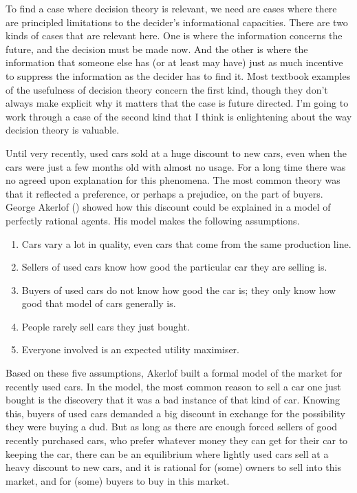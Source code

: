 \documentclass[
  10pt,
  letterpaper,
  DIV=11,
  numbers=noendperiod,
  twoside]{scrartcl}
\providecommand{\tightlist}{%
  \setlength{\itemsep}{0pt}\setlength{\parskip}{0pt}}\usepackage{longtable,booktabs,array}
\begin{document}
To find a case where decision theory is relevant, we need are cases
where there are principled limitations to the decider's informational
capacities. There are two kinds of cases that are relevant here. One is
where the information concerns the future, and the decision must be made
now. And the other is where the information that someone else has (or at
least may have) just as much incentive to suppress the information as
the decider has to find it. Most textbook examples of the usefulness of
decision theory concern the first kind, though they don't always make
explicit why it matters that the case is future directed. I'm going to
work through a case of the second kind that I think is enlightening
about the way decision theory is valuable.

Until very recently, used cars sold at a huge discount to new cars, even
when the cars were just a few months old with almost no usage. For a
long time there was no agreed upon explanation for this phenomena. The
most common theory was that it reflected a preference, or perhaps a
prejudice, on the part of buyers. George Akerlof
() showed how this discount could be
explained in a model of perfectly rational agents. His model makes the
following assumptions.

\begin{enumerate}
\def\labelenumi{\arabic{enumi}.}
\tightlist
\item
  Cars vary a lot in quality, even cars that come from the same
  production line.
\item
  Sellers of used cars know how good the particular car they are selling
  is.
\item
  Buyers of used cars do not know how good the car is; they only know
  how good that model of cars generally is.
\item
  People rarely sell cars they just bought.
\item
  Everyone involved is an expected utility maximiser.
\end{enumerate}

Based on these five assumptions, Akerlof built a formal model of the
market for recently used cars. In the model, the most common reason to
sell a car one just bought is the discovery that it was a bad instance
of that kind of car. Knowing this, buyers of used cars demanded a big
discount in exchange for the possibility they were buying a dud. But as
long as there are enough forced sellers of good recently purchased cars,
who prefer whatever money they can get for their car to keeping the car,
there can be an equilibrium where lightly used cars sell at a heavy
discount to new cars, and it is rational for (some) owners to sell into
this market, and for (some) buyers to buy in this market.
\end{document}
